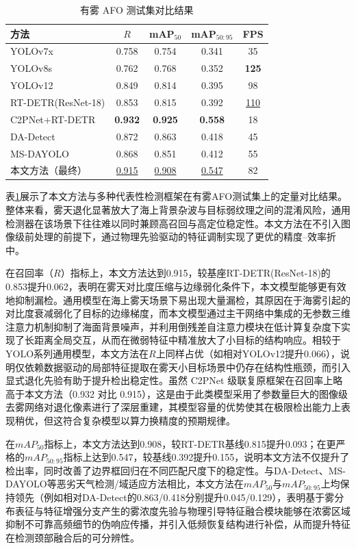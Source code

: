 \begin{table}[!htbp]
\centering
\caption{有雾 AFO 测试集对比结果}
\label{tab:afo_cmp}
\begin{tabular}{l c c c c}
\hline
方法 & $R$ & mAP$_{50}$ & mAP$_{50:95}$ & FPS \\
\hline
YOLOv7x & 0.758 & 0.754 & 0.341 & 35 \\
YOLOv8s & 0.762 & 0.768 & 0.352 & \textbf{125} \\
YOLOv12 & 0.849 & 0.814 & 0.395 & 98 \\
RT-DETR(ResNet-18) & 0.853 & 0.815 & 0.392 & \underline{110} \\
C2PNet+RT-DETR & \textbf{0.932} & \textbf{0.925} & \textbf{0.558} & 18 \\
DA-Detect & 0.872 & 0.863 & 0.418 & 45 \\
MS-DAYOLO & 0.868 & 0.851 & 0.412 & 55 \\
本文方法（最终） & \underline{0.915} & \underline{0.908} & \underline{0.547} & 82 \\
\hline
\end{tabular}
\end{table}
表\ref{tab:afo_cmp}展示了本文方法与多种代表性检测框架在有雾AFO测试集上的定量对比结果。整体来看，雾天退化显著放大了海上背景杂波与目标弱纹理之间的混淆风险，通用检测器在该场景下往往难以同时兼顾高召回与高定位稳定性。本文方法在不引入图像级前处理的前提下，通过物理先验驱动的特征调制实现了更优的精度–效率折中。

在召回率（$R$）指标上，本文方法达到0.915，较基座RT-DETR(ResNet-18)的0.853提升0.062，表明在雾天对比度压缩与边缘弱化条件下，本文模型能够更有效地抑制漏检。通用模型在海上雾天场景下易出现大量漏检，其原因在于海雾引起的对比度衰减弱化了目标的边缘梯度，而本文模型通过主干网络中集成的无参数三维注意力机制抑制了海面背景噪声，并利用倒残差自注意力模块在低计算复杂度下实现了长距离全局交互，从而在微弱特征中精准放大了小目标的结构响应。相较于YOLO系列通用模型，本文方法在$R$上同样占优（如相对YOLOv12提升0.066），说明仅依赖数据驱动的局部特征提取在雾天小目标场景中仍存在结构性瓶颈，而引入显式退化先验有助于提升检出稳定性。虽然 C2PNet 级联复原框架在召回率上略高于本文方法（0.932 对比 0.915），这是由于此类模型采用了参数量巨大的图像级去雾网络对退化像素进行了深层重建，其模型容量的优势使其在极限检出能力上表现稍优，但这符合复杂模型以算力换精度的预期规律。

在$mAP_{50}$指标上，本文方法达到0.908，较RT-DETR基线0.815提升0.093；在更严格的$mAP_{50:95}$指标上达到0.547，较基线0.392提升0.155，说明本文方法不仅提升了检出率，同时改善了边界框回归在不同匹配尺度下的稳定性。与DA-Detect、MS-DAYOLO等恶劣天气检测/域适应方法相比，本文方法在$mAP_{50}$与$mAP_{50:95}$上均保持领先（例如相对DA-Detect的0.863/0.418分别提升0.045/0.129），表明基于雾分布表征与特征增强分支产生的雾浓度先验与物理引导特征融合模块能够在浓雾区域抑制不可靠高频细节的伪响应传播，并引入低频恢复结构进行补偿，从而提升特征在检测颈部融合后的可分辨性。


